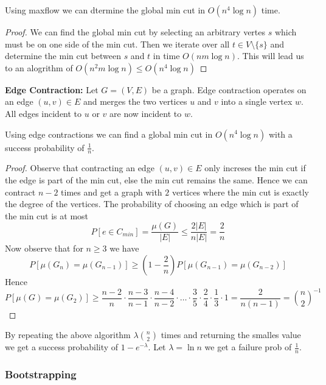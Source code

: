 \begin{theorem}
	Using maxflow we can dtermine the global min cut in $O(n^4\log n)$ time.
\end{theorem}

\begin{proof}
	We can find the global min cut by selecting an arbitrary vertes $s$ which must be on one side of the min cut. Then we iterate over all $t \in V \setminus \{s\}$ and determine the min cut between $s$ and $t$ in time $O(nm \log n)$. This will lead us to an alogrithm of $O(n^2 m  \log n) \leq O(n^4 \log n)$
\end{proof}

\begin{definition}
	\textbf{Edge Contraction: } Let $G=(V,E)$ be a graph. Edge contraction operates on an edge $(u,v) \in E$ and merges the two vertices $u$ and $v$ into a single vertex $w$. All edges incident to $u$ or $v$ are now incident to $w$.
\end{definition}

\begin{theorem}
	Using edge contractions we can find a global min cut in $O(n^4 \log n)$ with a success probability of $\frac{1}{n}$.
\end{theorem}

\begin{proof}
	Observe that contracting an edge $(u,v) \in E$ only increses the min cut if the edge is part of the min cut, else the min cut remains the same. Hence we can contract $n-2$ times and get a graph with $2$ vertices where the min cut is exactly the degree of the vertices.
	The probability of choosing an edge which is part of the min cut is at most
	$$P[e \in C_{min}] = \frac{\mu(G)}{|E|} \leq \frac{2 |E|}{n |E|} = \frac{2}{n}$$
	Now observe that for $n \geq 3$ we have
	$$P[\mu(G_n) = \mu(G_{n-1})] \geq (1 - \frac{2}{n}) P[\mu(G_{n-1}) = \mu(G_{n-2})]$$
	Hence
	$$P[\mu(G) = \mu(G_2)] \geq \frac{n-2}{n}\cdot\frac{n-3}{n-1}\cdot\frac{n-4}{n-2}\cdot\dots\cdot\frac{3}{5}\cdot\frac{2}{4}\cdot\frac{1}{3}\cdot1 = \frac{2}{n(n-1)} = \binom{n}{2}^{-1}$$
\end{proof}

\begin{theorem}
	By repeating the above algorithm $\lambda \binom{n}{2}$ times and returning the smalles value we get a success probability of $1 - e^{-\lambda}$. Let $\lambda = \ln n$ we get a failure prob of $\frac{1}{n}$.
\end{theorem}

\subsubsection{Bootstrapping}

